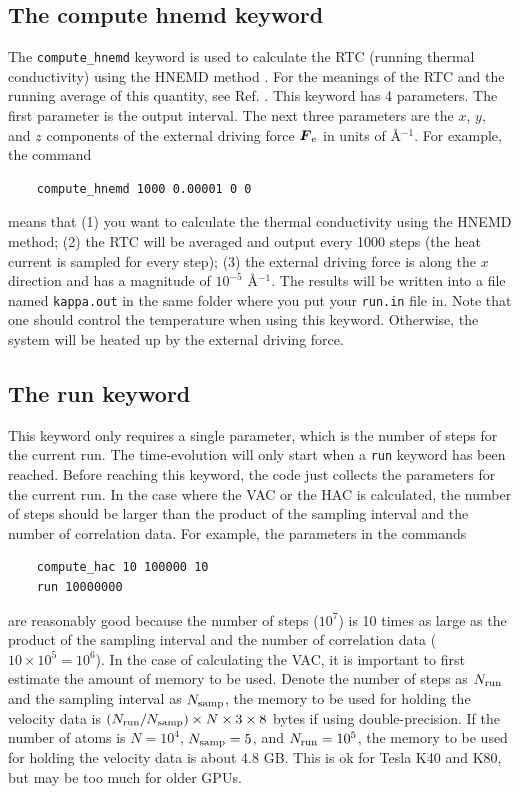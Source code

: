 \documentclass[12pt,a4paper]{report}
\newcommand{\vect}[1]{\boldsymbol{#1}}
\begin{document}
\subsection{The compute hnemd keyword}

The \verb"compute_hnemd" keyword is used to calculate the RTC (running thermal conductivity) using the HNEMD method \cite{fan2018submitted}. For the meanings of the RTC and the running average of this quantity, see Ref. \cite{fan2018submitted}. This keyword has 4 parameters. The first parameter is the output interval. The next three parameters are the $x$, $y$, and $z$ components of the external driving force $\vect{F}_{\rm e}$ in units of \AA$^{-1}$. For example, the command
\begin{verbatim}
    compute_hnemd 1000 0.00001 0 0
\end{verbatim}
means that (1) you want to calculate the thermal conductivity using the HNEMD method; (2) the RTC will be averaged and output every 1000 steps (the heat current is sampled for every step); (3) the external driving force is along the $x$ direction and has a magnitude of $10^{-5}$ \AA$^{-1}$. The results will be written into a file named \verb"kappa.out" in the same folder where you put your \verb"run.in" file in. Note that one should control the temperature when using this keyword. Otherwise, the system will be heated up by the external driving force. 


\subsection{The run keyword}

This keyword only requires a single parameter, which is the number of steps for the current run. The time-evolution will only start when a \verb"run" keyword has been reached. Before reaching this keyword, the code just collects the parameters for the current run. In the case where the VAC or the HAC is calculated, the number of steps should be larger than the product of the sampling interval and the number of correlation data. For example, the parameters in the commands
\begin{verbatim}
    compute_hac 10 100000 10
    run 10000000
\end{verbatim}
are reasonably good because the number of steps ($10^7$) is 10 times as large as the product of the sampling interval and the number of correlation data ($10\times 10^5=10^6$). In the case of calculating the VAC, it is important to first estimate the amount of memory to be used. Denote the number of steps as $N_{\textmd{run}}$ and the sampling interval as $N_{\textmd{samp}}$, the memory to be used for holding the velocity data is $(N_{\textmd{run}}/N_{\textmd{samp}})\times N \times 3 \times 8$ bytes if using double-precision. If the number of atoms is $N=10^4$, $N_{\textmd{samp}}=5$, and $N_{\textmd{run}}=10^5$, the memory to be used for holding the velocity data is about 4.8 GB. This is ok for Tesla K40 and K80, but may be too much for older GPUs.
\end{document}
